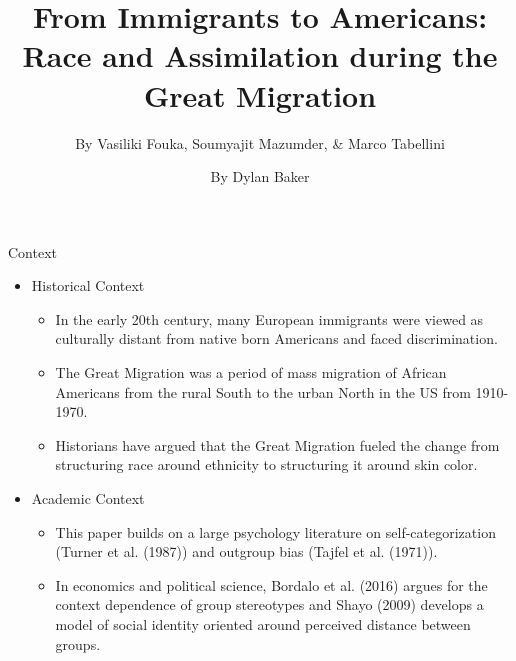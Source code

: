 \documentclass[11pt, aspectratio=169]{beamer}
\begin{document}
\title{From Immigrants to Americans: Race and Assimilation during the Great Migration}
\subtitle{By Vasiliki Fouka, Soumyajit Mazumder, \& Marco Tabellini}
\author{By Dylan Baker}
\date{ }

\begin{frame} 
\maketitle
\end{frame}


\begin{frame}{Context}

    \begin{itemize}
        \item Historical Context
            \begin{itemize}
                \item In the early 20th century, many European 
                    immigrants were viewed as culturally distant from native born 
                    Americans and faced discrimination.
                \item The Great Migration was a period of mass 
                    migration of African Americans from the rural South 
                    to the urban North in the US from 1910-1970.
                \item Historians have argued that the Great Migration 
                    fueled the change from structuring race 
                    around ethnicity to structuring it around skin color.
            \end{itemize}
        \item Academic Context
            \begin{itemize}
                \item This paper builds on a large psychology literature 
                    on self-categorization (Turner et al. (1987)) and 
                    outgroup bias (Tajfel et al. (1971)).
                \item In economics and political science, Bordalo et al. (2016) argues 
                    for the context dependence 
                    of group stereotypes and Shayo (2009) develops 
                    a model of social identity oriented around perceived distance 
                    between groups.
            \end{itemize}
    \end{itemize}

\end{frame}
\end{document}
